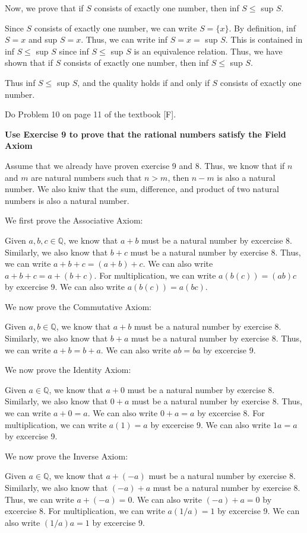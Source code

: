\documentclass[addpoints]{exam}
\begin{document}
\begin{questions}
Now, we prove that if $S$ consists of exactly one number, then inf $S \leq$ sup $S$.

Since $S$ consists of exactly one number, we can write $S = \{x\}$. By definition, inf $S = x$ and sup $S = x$.
Thus, we can write inf $S = x =$ sup $S$. This is contained in inf $S \leq$ sup $S$ since inf $S \leq$ sup $S$ 
is an equivalence relation. Thus, we have shown that if $S$ consists of exactly one number, then inf $S \leq$ sup $S$.

Thus inf $S \leq$ sup $S$, and the quality holds if and only if $S$ consists of exactly one number.


\question Do Problem 10 on page 11 of the textbook [F].

\textbf{Use Exercise 9 to prove that the rational numbers satisfy the Field Axiom}

Assume that we already have proven exercise 9 and 8. Thus, we know that if $n$ and $m$ are natural 
numbers such that $n > m$, then $n - m$ is also a natural number. We also kniw that the 
sum, difference, and product of two natural numbers is also a natural number.

We first prove the Associative Axiom:

Given $a, b, c \in \mathbb{Q}$, we know that $a + b$ must be a natural number by 
excercise 8. Similarly, we also know that $b + c$ must be a natural number by exercise 8.
Thus, we can write $a + b + c = (a + b) + c$. We can also write $a + b + c = a + (b + c)$.
For multiplication, we can write $a(b(c)) = (ab)c$ by excercise 9. We can also write $a(b(c)) = a(bc)$.

We now prove the Commutative Axiom:

Given $a, b \in \mathbb{Q}$, we know that $a + b$ must be a natural number by
exercise 8. Similarly, we also know that $b + a$ must be a natural number by exercise 8.
Thus, we can write $a + b = b + a$. We can also write $ab = ba$ by excercise 9.

We now prove the Identity Axiom:

Given $a \in \mathbb{Q}$, we know that $a + 0$ must be a natural number by
exercise 8. Similarly, we also know that $0 + a$ must be a natural number by exercise 8.
Thus, we can write $a + 0 = a$. We can also write $0 + a = a$ by excercise 8.
For multiplication, we can write $a(1) = a$ by excercise 9. We can also write $1a = a$ 
by excercise 9.

We now prove the Inverse Axiom:

Given $a \in \mathbb{Q}$, we know that $a + (-a)$ must be a natural number by
exercise 8. Similarly, we also know that $(-a) + a$ must be a natural number by exercise 8.
Thus, we can write $a + (-a) = 0$. We can also write $(-a) + a = 0$ by excercise 8.
For multiplication, we can write $a(1/a) = 1$ by excercise 9. We can also write $(1/a)a = 1$
by excercise 9.


\end{questions}
\end{document}
